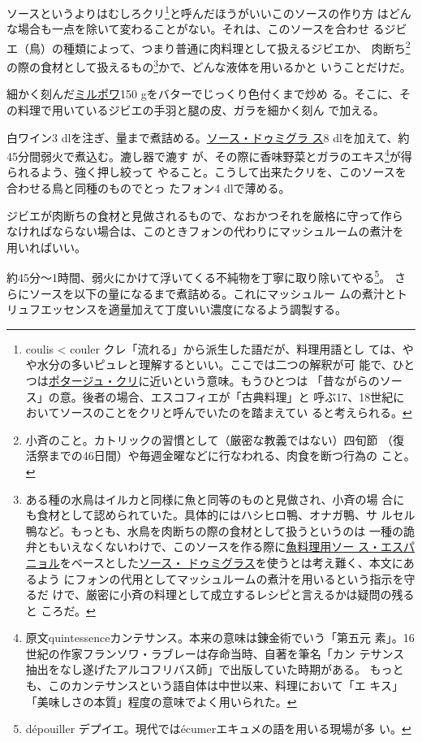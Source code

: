 \begin{recette}
ソースというよりはむしろクリ\footnote{coulis \textless{} couler
  クレ「流れる」から派生した語だが、料理用語とし
  ては、やや水分の多いピュレと理解するといい。ここでは二つの解釈が可
  能で、ひとつは\protect\hyperlink{}{ポタージュ・クリ}に近いという意味。もうひとつは
  「昔ながらのソース」の意。後者の場合、エスコフィエが「古典料理」と
  呼ぶ17、18世紀においてソースのことをクリと呼んでいたのを踏まえてい
  ると考えられる。}と呼んだほうがいいこのソースの作り方
はどんな場合も一点を除いて変わることがない。それは、このソースを合わせ
るジビエ（鳥）の種類によって、つまり普通に肉料理として扱えるジビエか、
肉断ち\footnote{小斉のこと。カトリックの習慣として（厳密な教義ではない）四旬節
  （復活祭までの46日間）や毎週金曜などに行なわれる、肉食を断つ行為の
  こと。}の際の食材として扱えるもの\footnote{ある種の水鳥はイルカと同様に魚と同等のものと見做され、小斉の場
  合にも食材として認められていた。具体的にはハシヒロ鴨、オナガ鴨、サ
  ルセル鴨など。もっとも、水鳥を肉断ちの際の食材として扱うというのは
  一種の詭弁ともいえなくないわけで、このソースを作る際に\protect\hyperlink{sauce-espagnole-maigre}{魚料理用ソー
  ス・エスパニョル}をベースとした\protect\hyperlink{sauce-demi-glace}{ソース・
  ドゥミグラス}を使うとは考え難く、本文にあるよう
  にフォンの代用としてマッシュルームの煮汁を用いるという指示を守るだ
  けで、厳密に小斉の料理として成立するレシピと言えるかは疑問の残ると
  ころだ。}かで、どんな液体を用いるかと いうことだけだ。

細かく刻んだ\protect\hyperlink{mirepoix}{ミルポワ}150
gをバターでじっくり色付くまで炒め
る。そこに、その料理で用いているジビエの手羽と腿の皮、ガラを細かく刻ん
で加える。

白ワイン3
dlを注ぎ、\untiers{}量まで煮詰める。\protect\hyperlink{sauce-demi-glace}{ソース・ドゥミグラ
ス}8 dlを加えて、約45分間弱火で煮込む。漉し器で漉す
が、その際に香味野菜とガラのエキス\footnote{原文quintessenceカンテサンス。本来の意味は錬金術でいう「第五元
  素」。16世紀の作家フランソワ・ラブレーは存命当時、自著を筆名「カン
  テサンス抽出をなし遂げたアルコフリバス師」で出版していた時期がある。
  もっとも、このカンテサンスという語自体は中世以来、料理において「エ
  キス」「美味しさの本質」程度の意味でよく用いられた。}が得られるよう、強く押し絞って
やること。こうして出来たクリを、このソースを合わせる鳥と同種のものでとっ
たフォン4 dlで薄める。

ジビエが肉断ちの食材と見做されるもので、なおかつそれを厳格に守って作ら
なければならない場合は、このときフォンの代わりにマッシュルームの煮汁を
用いればいい。

約45分〜1時間、弱火にかけて浮いてくる不純物を丁寧に取り除いてやる\footnote{dépouiller
  デプイエ。現代ではécumerエキュメの語を用いる現場が多 い。}。
さらにソースを\deuxtiers{}以下の量になるまで煮詰める。これにマッシュルー
ムの煮汁とトリュフエッセンスを適量加えて丁度いい濃度になるよう調製する。


\end{recette}
